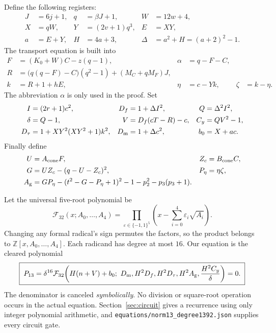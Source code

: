 \documentclass[11pt,a4paper]{article}
\theoremstyle{definition}\newtheorem{definition}[theorem]{Definition}
\theoremstyle{remark}\newtheorem{remark}[theorem]{Remark}
\newcommand{\Z}{\mathbb Z}\newcommand{\Q}{\mathbb Q}\newcommand{\N}{\mathbb N}
\newcommand{\F}{\mathcal F}\newcommand{\Cal}{\mathcal K}
\newcommand{\Dm}{D_{\rm m}}\newcommand{\Dt}{D_{\tau}}
\newcommand{\Df}{D_f}\newcommand{\Dy}{D_y}\newcommand{\Ag}{A_{\rm g}}
\numberwithin{equation}{section}
\begin{document}
Define the following registers:
\begin{align}
J&=6j+1,&q&=\beta J+1,&W&=12w+4,\nonumber\\
X&=qW,&Y&=(2v+1)q^3,&E&=XY,\nonumber\\
a&=E+Y,&H&=4a+3,&\Delta&=a^2+H=(a+2)^2-1.
\label{eq:front1}
\end{align}
The transport equation is built into
\begin{align}
F&=(K_0+W)C-z(q-1),&\alpha&=q-F-C,\nonumber\\
R&=\bigl(q(q-F)-C\bigr)(q^2-1)+(M_C+qM_F)J,\nonumber\\
k&=R+1+hE,&\eta&=c-Yk,&\zeta&=k-\eta.
\label{eq:front2}
\end{align}
The abbreviation \(\alpha\) is only used in the proof. Set
\begin{align}
I&=(2r+1)c^2,&\Df&=1+\Delta I^2,&Q&=\Delta^2I^2,\nonumber\\
\delta&=Q-1,&V&=\Df(cT-R)-c,&C_y&=QV^2-1,\nonumber\\
\Dt&=1+XY^2(XY^2+1)k^2,&
\Dm&=1+\Delta c^2,&b_0&=X+ac.
\label{eq:front3}
\end{align}
Finally define
\begin{align}
U&=A_{\rm cone}F,&Z_c&=B_{\rm cone}C,\nonumber\\
G&=UZ_c-(q-U-Z_c)^2,&P_\eta&=\eta\zeta,\nonumber\\
\Ag&=GP_\eta-(t^2-G-P_\eta+1)^2
-1-p_2^2-p_3(p_3+1).
\label{eq:guard}
\end{align}

Let the universal five-root polynomial be
\begin{equation}
\F_{32}(x;A_0,\ldots,A_4)=
\prod_{\varepsilon\in\{-1,1\}^5}
\left(x-\sum_{i=0}^4\varepsilon_i\sqrt{A_i}\right).
\label{eq:F32}
\end{equation}
Changing any formal radical's sign permutes the factors, so the product
belongs to \(\Z[x,A_0,\ldots,A_4]\). Each radicand has degree at most
\(16\). Our equation is the cleared polynomial
\begin{equation}
\boxed{\;
P_{13}=\delta^{16}\F_{32}\!\left(
H(n+V)+b_0;\
\Dm,H^2\Df,H^2\Dt,H^2\Ag,\frac{H^2C_y}{\delta}
\right)=0.\;}
\label{eq:main}
\end{equation}
The denominator is canceled \emph{symbolically}. No division or
square-root operation occurs in the actual equation.
Section~\ref{sec:circuit} gives a recurrence using only integer
polynomial arithmetic, and
\texttt{equations/norm13\_degree1392.json} supplies every circuit gate.
\end{document}
